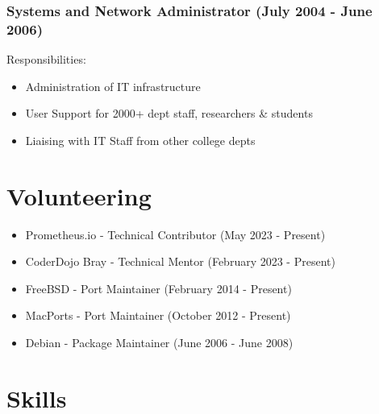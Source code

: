 \documentclass[a4paper, 10pt] {article}
\begin{document}
\subsubsection*{Systems and Network Administrator (July 2004 - June 2006)}

\vspace{3mm}  %

Responsibilities:

\begin{itemize}
  \item Administration of IT infrastructure
  \item User Support for 2000+ dept staff, researchers \& students
  \item Liaising with IT Staff from other college depts
\end{itemize}

\hrulefill

\section*{Volunteering}

\begin{itemize}
  \item Prometheus.io - Technical Contributor (May 2023 - Present)
  \item CoderDojo Bray - Technical Mentor (February 2023 - Present)
  \item FreeBSD - Port Maintainer (February 2014 - Present)
  \item MacPorts - Port Maintainer (October 2012 - Present)
  \item Debian - Package Maintainer (June 2006 - June 2008)
\end{itemize}

\hrulefill

\section*{Skills}
\end{document}
